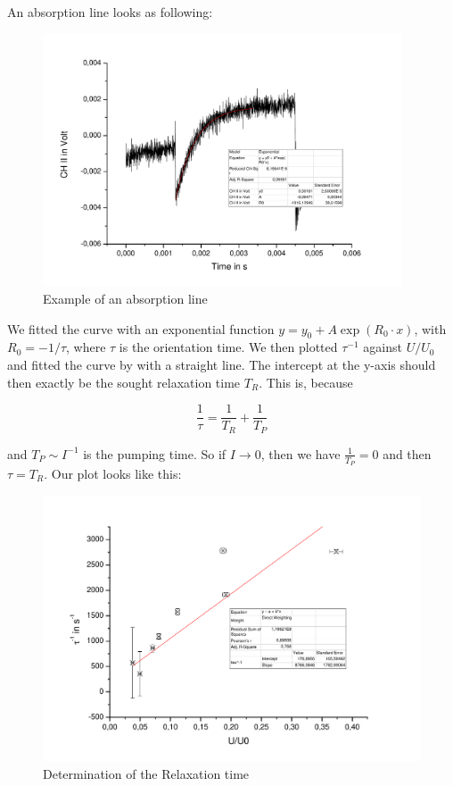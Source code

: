 An absorption line looks as following: 

\begin{figure}[H]
\centering \includegraphics[width=0.95\textwidth]{BilderAusw/DehmeltBsp.pdf}
\caption{Example of an absorption line}
\label{dehmeltbsp}
\end{figure}

We fitted the curve with an exponential function $y=y_0 + A\exp(R_0\cdot x)$, with $R_0 = -1/\tau$, where $\tau$ is the orientation time. We then plotted $\tau^{-1}$ against $U/U_0$ and fitted the curve by with a straight line. The intercept at the y-axis should then exactly be the sought relaxation time $T_R$. This is, because

$$\frac{1}{\tau} = \frac{1}{T_R} + \frac{1}{T_P}$$

and $T_P \sim I^{-1}$ is the pumping time. So if $I \to 0$, then we have $\frac{1}{T_P} = 0$ and then $\tau = T_R$. Our plot looks like this:\\

\begin{figure}[H]
\centering \includegraphics[width=\textwidth]{BilderAusw/Dehmelt.pdf}
\caption{Determination of the Relaxation time}
\end{figure}


